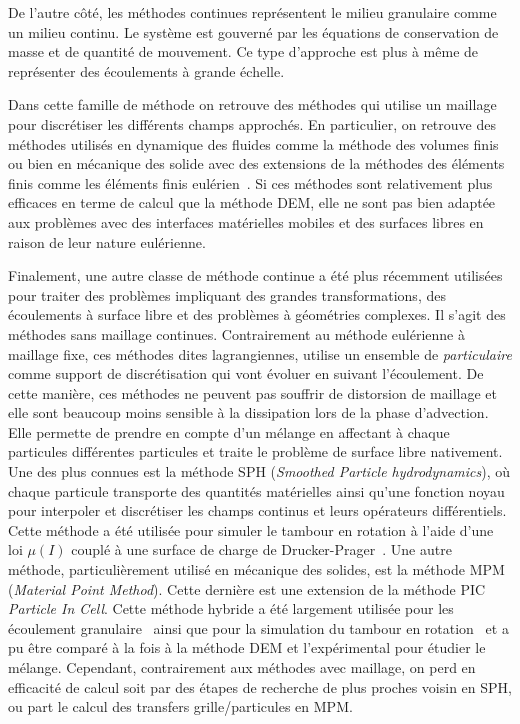 De l'autre côté, les méthodes continues représentent le milieu granulaire comme un milieu continu. Le système est gouverné par les équations de conservation de masse et de quantité de mouvement. Ce type d'approche est plus à même de représenter des écoulements à grande échelle.

Dans cette famille de méthode on retrouve des méthodes qui utilise un maillage pour discrétiser les différents champs approchés. En particulier, on retrouve des méthodes utilisés en dynamique des fluides comme la méthode des volumes finis~\cite{Santos2013,arseni_granular_2020} ou bien en mécanique des solide avec des extensions de la méthodes des éléments finis comme les éléments finis eulérien~\cite{ZHENG2015361}. Si ces méthodes sont relativement plus efficaces en terme de calcul que la méthode DEM, elle ne sont pas bien adaptée aux problèmes avec des interfaces matérielles mobiles et des surfaces libres en raison de leur nature eulérienne.

Finalement, une autre classe de méthode continue a été plus récemment utilisées pour traiter des problèmes impliquant des grandes transformations, des écoulements à surface libre et des problèmes à géométries complexes. Il s'agit des méthodes sans maillage continues. Contrairement au méthode eulérienne à maillage fixe, ces méthodes dites lagrangiennes, utilise un ensemble de \textit{particulaire} comme support de discrétisation qui vont évoluer en suivant l'écoulement. De cette manière, ces méthodes ne peuvent pas souffrir de distorsion de maillage et elle sont beaucoup moins sensible à la dissipation lors de la phase d'advection. Elle permette de prendre en compte d’un mélange en affectant à chaque particules différentes particules et traite le problème de surface libre nativement. Une des plus connues est la méthode SPH (\textit{Smoothed Particle hydrodynamics}), où chaque particule transporte des quantités matérielles ainsi qu'une fonction noyau pour interpoler et discrétiser les champs continus et leurs opérateurs différentiels. Cette méthode a été utilisée pour simuler le tambour en rotation à l'aide d'une loi $\mu(I)$ couplé à une surface de charge de Drucker-Prager~\cite{zhu_lagrangian_2022}. Une autre méthode, particulièrement utilisé en mécanique des solides, est la méthode MPM (\textit{Material Point Method}). Cette dernière est une extension de la méthode PIC \textit{Particle In Cell}. Cette méthode hybride a été largement utilisée pour les écoulement granulaire~\cite{KUMAR201794} ainsi que pour la simulation du tambour en rotation~\cite{zuo_numerical_2020, chandra_nonconforming_2021} et a pu être comparé à la fois à la méthode DEM et l'expérimental pour étudier le mélange. Cependant, contrairement aux méthodes avec maillage, on perd en efficacité de calcul soit par des étapes de recherche de plus proches voisin en SPH, ou part le calcul des transfers grille/particules en MPM.

